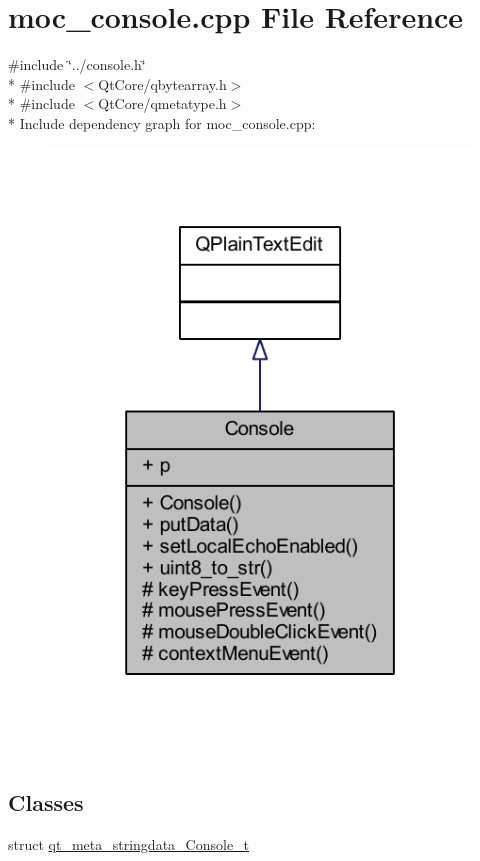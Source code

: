 \hypertarget{a00064}{\section{moc\+\_\+console.\+cpp File Reference}
\label{a00064}
}
{\ttfamily \#include \char`\"{}../console.\+h\char`\"{}}\\*
{\ttfamily \#include $<$Qt\+Core/qbytearray.\+h$>$}\\*
{\ttfamily \#include $<$Qt\+Core/qmetatype.\+h$>$}\\*
Include dependency graph for moc\+\_\+console.\+cpp\+:
\nopagebreak
\begin{figure}[H]
\begin{center}
\leavevmode
\includegraphics[width=350pt]{dc/dc9/a00282}
\end{center}
\end{figure}
\subsection*{Classes}
\begin{DoxyCompactItemize}
\item 
struct \hyperlink{a00064_d6/daa/a00187}{qt\+\_\+meta\+\_\+stringdata\+\_\+\+Console\+\_\+t}
\end{DoxyCompactItemize}
